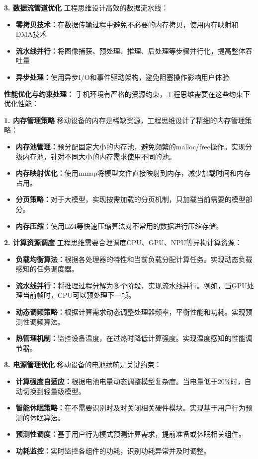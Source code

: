 \textbf{3. 数据流管道优化}
工程思维设计高效的数据流水线：
\begin{itemize}
\item \textbf{零拷贝技术：}在数据传输过程中避免不必要的内存拷贝，使用内存映射和DMA技术
\item \textbf{流水线并行：}将图像捕获、预处理、推理、后处理等步骤并行化，提高整体吞吐量
\item \textbf{异步处理：}使用异步I/O和事件驱动架构，避免阻塞操作影响用户体验
\end{itemize}

\textbf{性能优化与约束处理：}
手机环境有严格的资源约束，工程思维需要在这些约束下优化性能：

\textbf{1. 内存管理策略}
移动设备的内存是稀缺资源，工程思维设计了精细的内存管理策略：
\begin{itemize}
\item \textbf{内存池管理：}预分配固定大小的内存池，避免频繁的malloc/free操作。实现分级内存池，针对不同大小的内存需求使用不同的池。
\item \textbf{内存映射优化：}使用mmap将模型文件直接映射到内存，减少加载时间和内存占用。
\item \textbf{分页策略：}对于大模型，实现按需加载的分页机制，只加载当前需要的模型部分。
\item \textbf{内存压缩：}使用LZ4等快速压缩算法对不常用的数据进行压缩存储。
\end{itemize}

\textbf{2. 计算资源调度}
工程思维需要合理调度CPU、GPU、NPU等异构计算资源：
\begin{itemize}
\item \textbf{负载均衡算法：}根据各处理器的特性和当前负载分配计算任务。实现动态负载感知的任务调度器。
\item \textbf{流水线并行：}将推理过程分解为多个阶段，实现流水线并行。例如，当GPU处理当前帧时，CPU可以预处理下一帧。
\item \textbf{动态调频策略：}根据计算需求动态调整处理器频率，平衡性能和功耗。实现预测性调频算法。
\item \textbf{热管理机制：}监控设备温度，在过热时降低计算强度。实现温度感知的性能调节器。
\end{itemize}

\textbf{3. 电源管理优化}
移动设备的电池续航是关键约束：
\begin{itemize}
\item \textbf{计算强度自适应：}根据电池电量动态调整模型复杂度。当电量低于20\%时，自动切换到轻量级模型。
\item \textbf{智能休眠策略：}在不需要识别时及时关闭相关硬件模块。实现基于用户行为预测的休眠算法。
\item \textbf{预测性调度：}基于用户行为模式预测计算需求，提前准备或休眠相关组件。
\item \textbf{功耗监控：}实时监控各组件的功耗，识别功耗异常并及时调整。
\end{itemize}

